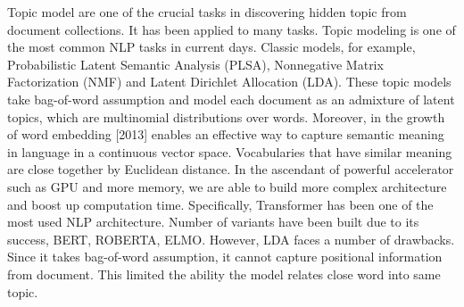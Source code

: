 Topic model are one of the crucial tasks in discovering hidden topic from document collections. It has been applied to many tasks. 
Topic modeling is one of the most common NLP tasks in current days. Classic models, for example, Probabilistic Latent Semantic Analysis (PLSA), Nonnegative Matrix Factorization (NMF) and Latent Dirichlet Allocation (LDA). These topic models take bag-of-word assumption and model each document as an admixture of latent topics, which are multinomial distributions over words.
Moreover, in the growth of word embedding [2013] enables an effective way to capture semantic meaning in language in a continuous vector space. Vocabularies that have similar meaning are close together by Euclidean distance. 
In the ascendant of powerful accelerator such as GPU and more memory, we are able to build more complex architecture and boost up computation time. Specifically, Transformer has been one of the most used NLP architecture. Number of variants have been built due to its success, BERT, ROBERTA, ELMO. 
However, LDA faces a number of drawbacks. Since it takes bag-of-word assumption, it cannot capture positional information from document. This limited the ability the model relates close word into same topic.
